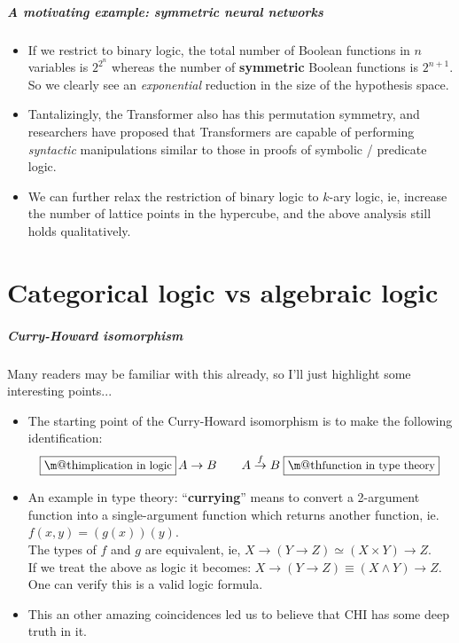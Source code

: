 \documentclass[16pt]{beamer}
\makeatletter
\renewcommand{\boxed}[1]{\fbox{\m@th$\displaystyle\scalebox{0.9}{#1}$} \,}
\makeatother
\begin{document}
\begin{frame}
	\frametitle{A motivating example: symmetric neural networks}
	\begin{itemize}
		\item If we restrict to binary logic, the total number of Boolean functions in $n$ variables is $2^{2^n}$ whereas the number of \textbf{symmetric} Boolean functions is $2^{n+1}$.  So we clearly see an \textit{exponential} reduction in the size of the hypothesis space.
		
		\item Tantalizingly, the Transformer also has this permutation symmetry, and researchers have proposed that Transformers are capable of performing \textit{syntactic} manipulations similar to those in proofs of symbolic / predicate logic.
		
		\item We can further relax the restriction of binary logic to $k$-ary logic, ie, increase the number of lattice points in the hypercube, and the above analysis still holds qualitatively.
	\end{itemize}
\end{frame}

\part{Categorical logic vs algebraic logic}
\frame{\partpage}

\begin{frame}
\frametitle{Curry-Howard isomorphism}
Many readers may be familiar with this already, so I'll just highlight some interesting points...
\begin{itemize}
	\item The starting point of the Curry-Howard isomorphism is to make the following identification:
	\begin{equation}
		\boxed{implication in logic} A \rightarrow B \qquad A \stackrel{f}{\rightarrow} B \; \boxed{function in type theory}
		\nonumber
	\end{equation}
	\item An example in type theory: ``\textbf{currying}'' means to convert a 2-argument function into a single-argument function which returns another function, ie. $f(x,y) = (g(x))(y)$.  \\
	The types of $f$ and $g$ are equivalent, ie, $X \rightarrow (Y \rightarrow Z) \simeq (X \times Y) \rightarrow Z$. \\
	If we treat the above as logic it becomes: $X \rightarrow (Y \rightarrow Z) \equiv (X \wedge Y) \rightarrow Z$.  One can verify this is a valid logic formula.
	\item This an other amazing coincidences led us to believe that CHI has some deep truth in it.
\end{itemize}
\end{frame}
\end{document}
